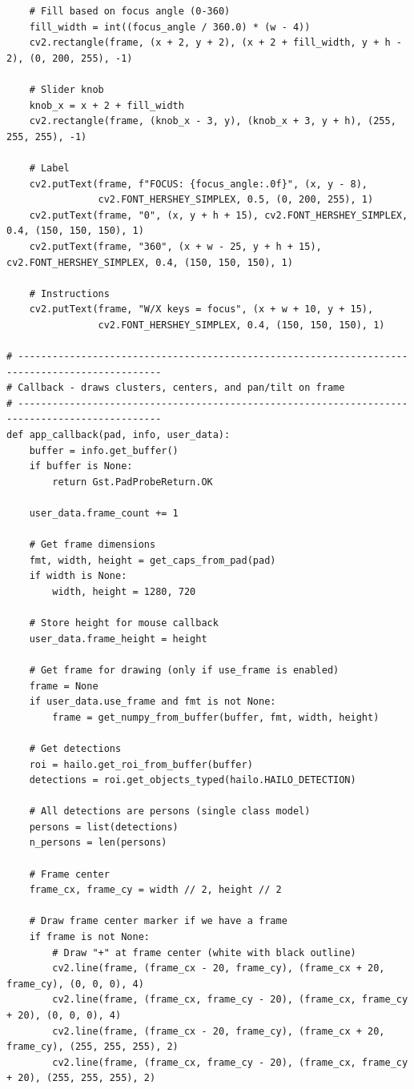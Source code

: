 \documentclass[11pt,a4paper]{article}
\begin{document}
\begin{lstlisting}
    # Fill based on focus angle (0-360)
    fill_width = int((focus_angle / 360.0) * (w - 4))
    cv2.rectangle(frame, (x + 2, y + 2), (x + 2 + fill_width, y + h - 2), (0, 200, 255), -1)
    
    # Slider knob
    knob_x = x + 2 + fill_width
    cv2.rectangle(frame, (knob_x - 3, y), (knob_x + 3, y + h), (255, 255, 255), -1)
    
    # Label
    cv2.putText(frame, f"FOCUS: {focus_angle:.0f}", (x, y - 8), 
                cv2.FONT_HERSHEY_SIMPLEX, 0.5, (0, 200, 255), 1)
    cv2.putText(frame, "0", (x, y + h + 15), cv2.FONT_HERSHEY_SIMPLEX, 0.4, (150, 150, 150), 1)
    cv2.putText(frame, "360", (x + w - 25, y + h + 15), cv2.FONT_HERSHEY_SIMPLEX, 0.4, (150, 150, 150), 1)
    
    # Instructions
    cv2.putText(frame, "W/X keys = focus", (x + w + 10, y + 15), 
                cv2.FONT_HERSHEY_SIMPLEX, 0.4, (150, 150, 150), 1)

# -----------------------------------------------------------------------------------------------
# Callback - draws clusters, centers, and pan/tilt on frame
# -----------------------------------------------------------------------------------------------
def app_callback(pad, info, user_data):
    buffer = info.get_buffer()
    if buffer is None:
        return Gst.PadProbeReturn.OK
    
    user_data.frame_count += 1
    
    # Get frame dimensions
    fmt, width, height = get_caps_from_pad(pad)
    if width is None:
        width, height = 1280, 720
    
    # Store height for mouse callback
    user_data.frame_height = height
    
    # Get frame for drawing (only if use_frame is enabled)
    frame = None
    if user_data.use_frame and fmt is not None:
        frame = get_numpy_from_buffer(buffer, fmt, width, height)
    
    # Get detections
    roi = hailo.get_roi_from_buffer(buffer)
    detections = roi.get_objects_typed(hailo.HAILO_DETECTION)
    
    # All detections are persons (single class model)
    persons = list(detections)
    n_persons = len(persons)
    
    # Frame center
    frame_cx, frame_cy = width // 2, height // 2
    
    # Draw frame center marker if we have a frame
    if frame is not None:
        # Draw "+" at frame center (white with black outline)
        cv2.line(frame, (frame_cx - 20, frame_cy), (frame_cx + 20, frame_cy), (0, 0, 0), 4)
        cv2.line(frame, (frame_cx, frame_cy - 20), (frame_cx, frame_cy + 20), (0, 0, 0), 4)
        cv2.line(frame, (frame_cx - 20, frame_cy), (frame_cx + 20, frame_cy), (255, 255, 255), 2)
        cv2.line(frame, (frame_cx, frame_cy - 20), (frame_cx, frame_cy + 20), (255, 255, 255), 2)
    

\end{lstlisting}
\end{document}
